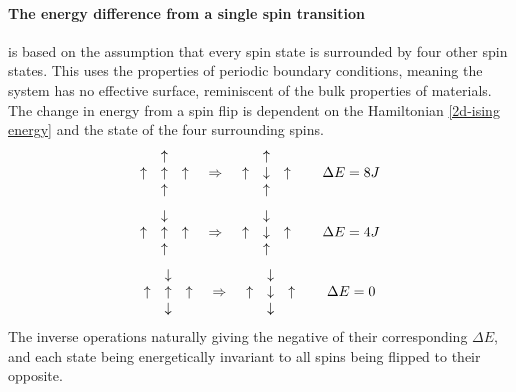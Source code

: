 \documentclass[10pt,a4paper]{article}
\begin{document}
\paragraph{The energy difference from a single spin transition}is based on the assumption that every spin state is surrounded by four other spin states. This uses the properties of periodic boundary conditions, meaning the system has no effective surface, reminiscent of the bulk properties of materials. The change in energy from a spin flip is dependent on the Hamiltonian \eqref{2d-ising energy} and the state of the four surrounding spins.
\begin{equation*}
\begin{matrix}
 & \uparrow & \\ 
 \uparrow & \uparrow & \uparrow \\ 
 & \uparrow & 
\end{matrix}\hspace{4mm}\Rightarrow\hspace{4mm}
\begin{matrix}
 & \uparrow & \\ 
 \uparrow & \downarrow & \uparrow \\ 
 & \uparrow & 
\end{matrix}\hspace{8mm} \Delta E=8J
\end{equation*}
\begin{equation*}
\begin{matrix}
 & \downarrow & \\ 
 \uparrow & \uparrow & \uparrow \\ 
 & \uparrow & 
\end{matrix}\hspace{4mm}\Rightarrow\hspace{4mm}
\begin{matrix}
 & \downarrow & \\ 
 \uparrow & \downarrow & \uparrow \\ 
 & \uparrow & 
\end{matrix}\hspace{8mm} \Delta E=4J
\end{equation*}
\begin{equation*}
\begin{matrix}
 & \downarrow & \\ 
 \uparrow & \uparrow & \uparrow \\ 
 & \downarrow & 
\end{matrix}\hspace{4mm}\Rightarrow\hspace{4mm}
\begin{matrix}
 & \downarrow & \\ 
 \uparrow & \downarrow & \uparrow \\ 
 & \downarrow & 
\end{matrix}\hspace{8mm} \Delta E=0
\end{equation*}
The inverse operations naturally giving the negative of their corresponding $\Delta E$, and each state being energetically invariant to all spins being flipped to their opposite.
\end{document}
